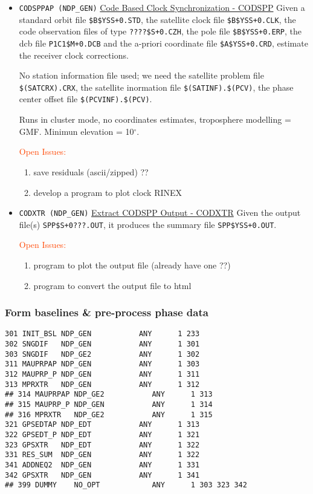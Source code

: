 \begin{itemize}
  \item \texttt{CODSPPAP (NDP\_GEN)} \underline{Code Based Clock Synchronization - CODSPP}
    Given a standard orbit file \texttt{\$B\$YSS+0.STD}, the satellite clock file
    \texttt{\$B\$YSS+0.CLK}, the code observation files of type \texttt{????\$S+0.CZH},
    the pole file \texttt{\$B\$YSS+0.ERP}, the dcb file \texttt{P1C1\$M+0.DCB} and
    the a-priori coordinate file \texttt{\$A\$YSS+0.CRD}, estimate the receiver
    clock corrections.

    No station information file used; we need  the satellite problem file 
    \texttt{\$(SATCRX).CRX}, the satellite inormation file \texttt{\$(SATINF).\$(PCV)},
    the phase center offset file \texttt{\$(PCVINF).\$(PCV)}.

    Runs in cluster mode, no coordinates estimates, troposphere modelling = GMF.
    Minimun elevation = 10$^{\circ}$.
    
    \textcolor{OrangeRed}{Open Issues:}
    \begin{enumerate}
      \item save residuals (ascii/zipped) ??
      \item develop a program to plot clock RINEX
    \end{enumerate}

  \item \texttt{CODXTR (NDP\_GEN)} \underline{Extract CODSPP Output - CODXTR}
    Given the output file(s) \texttt{SPP\$S+0???.OUT}, it produces the summary
    file \texttt{SPP\$YSS+0.OUT}.

    \textcolor{OrangeRed}{Open Issues:}
    \begin{enumerate}
      \item program to plot the output file (already have one ??)
      \item program to convert the output file to html
    \end{enumerate}

\end{itemize}

\subsubsection{Form baselines \& pre-process phase data}\label{ddp-fbppd}
\begin{verbatim}
301 INIT_BSL NDP_GEN           ANY      1 233
302 SNGDIF   NDP_GEN           ANY      1 301
303 SNGDIF   NDP_GE2           ANY      1 302
311 MAUPRPAP NDP_GEN           ANY      1 303
312 MAUPRP_P NDP_GEN           ANY      1 311
313 MPRXTR   NDP_GEN           ANY      1 312
## 314 MAUPRPAP NDP_GE2           ANY      1 313
## 315 MAUPRP_P NDP_GEN           ANY      1 314
## 316 MPRXTR   NDP_GE2           ANY      1 315
321 GPSEDTAP NDP_EDT           ANY      1 313
322 GPSEDT_P NDP_EDT           ANY      1 321
323 GPSXTR   NDP_EDT           ANY      1 322
331 RES_SUM  NDP_GEN           ANY      1 322
341 ADDNEQ2  NDP_GEN           ANY      1 331
342 GPSXTR   NDP_GEN           ANY      1 341
## 399 DUMMY    NO_OPT            ANY      1 303 323 342
\end{verbatim}

